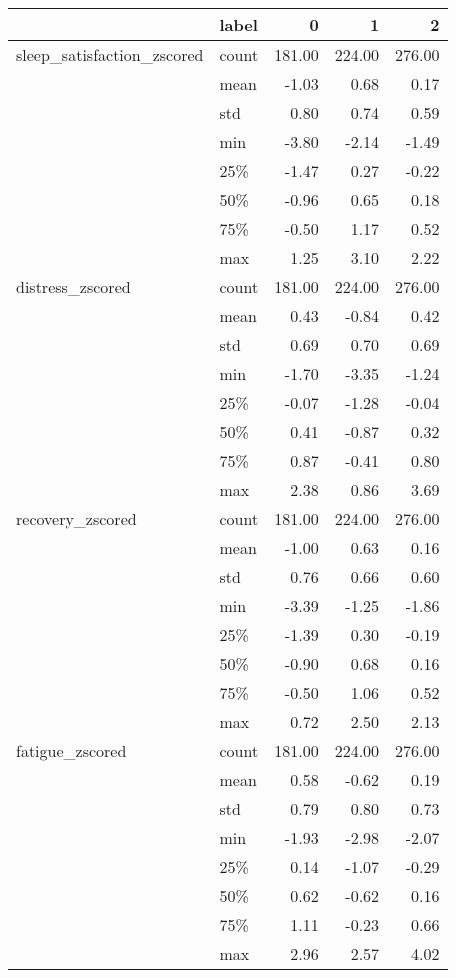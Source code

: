 \begin{tabular}{llrrr}
\toprule
                & label &       0 &       1 &       2 \\
\midrule
sleep\_satisfaction\_zscored & count &  181.00 &  224.00 &  276.00 \\
                & mean &   -1.03 &    0.68 &    0.17 \\
                & std &    0.80 &    0.74 &    0.59 \\
                & min &   -3.80 &   -2.14 &   -1.49 \\
                & 25\% &   -1.47 &    0.27 &   -0.22 \\
                & 50\% &   -0.96 &    0.65 &    0.18 \\
                & 75\% &   -0.50 &    1.17 &    0.52 \\
                & max &    1.25 &    3.10 &    2.22 \\
distress\_zscored & count &  181.00 &  224.00 &  276.00 \\
                & mean &    0.43 &   -0.84 &    0.42 \\
                & std &    0.69 &    0.70 &    0.69 \\
                & min &   -1.70 &   -3.35 &   -1.24 \\
                & 25\% &   -0.07 &   -1.28 &   -0.04 \\
                & 50\% &    0.41 &   -0.87 &    0.32 \\
                & 75\% &    0.87 &   -0.41 &    0.80 \\
                & max &    2.38 &    0.86 &    3.69 \\
recovery\_zscored & count &  181.00 &  224.00 &  276.00 \\
                & mean &   -1.00 &    0.63 &    0.16 \\
                & std &    0.76 &    0.66 &    0.60 \\
                & min &   -3.39 &   -1.25 &   -1.86 \\
                & 25\% &   -1.39 &    0.30 &   -0.19 \\
                & 50\% &   -0.90 &    0.68 &    0.16 \\
                & 75\% &   -0.50 &    1.06 &    0.52 \\
                & max &    0.72 &    2.50 &    2.13 \\
fatigue\_zscored & count &  181.00 &  224.00 &  276.00 \\
                & mean &    0.58 &   -0.62 &    0.19 \\
                & std &    0.79 &    0.80 &    0.73 \\
                & min &   -1.93 &   -2.98 &   -2.07 \\
                & 25\% &    0.14 &   -1.07 &   -0.29 \\
                & 50\% &    0.62 &   -0.62 &    0.16 \\
                & 75\% &    1.11 &   -0.23 &    0.66 \\
                & max &    2.96 &    2.57 &    4.02 \\
\bottomrule
\end{tabular}
